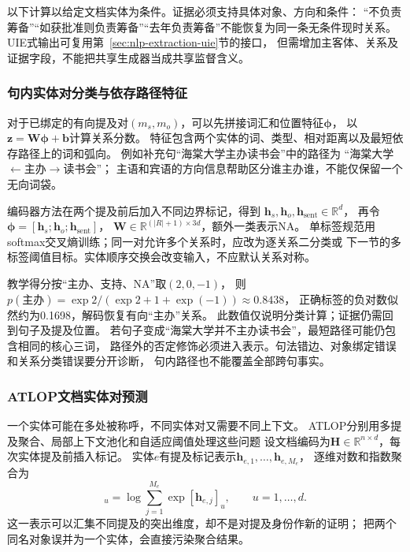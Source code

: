 以下计算以给定文档实体为条件。证据必须支持具体对象、方向和条件：
“不负责筹备”“如获批准则负责筹备”“去年负责筹备”不能恢复为同一条无条件现时关系。
UIE式输出可复用第~\ref{sec:nlp-extraction-uie}节的接口，
但需增加主客体、关系及证据字段，不能把共享生成器当成共享监督含义。

\subsubsection{句内实体对分类与依存路径特征}
\label{sec:nlp-extraction-sentence-re}

对于已绑定的有向提及对$(m_s,m_o)$，可以先拼接词汇和位置特征$\bm{\phi}$，
以$\bm{z}=\bm{W}\bm{\phi}+\bm{b}$计算关系分数。
特征包含两个实体的词、类型、相对距离以及最短依存路径上的词和弧向。
例如补充句“海棠大学主办读书会”中的路径为
“海棠大学$\leftarrow$主办$\rightarrow$读书会”；
主语和宾语的方向信息帮助区分谁主办谁，不能仅保留一个无向词袋。

编码器方法在两个提及前后加入不同边界标记，得到
$\bm{h}_s,\bm{h}_o,\bm{h}_{\mathrm{sent}}\in\mathbb{R}^{d}$，
再令$\bm{\phi}=[\bm{h}_s;\bm{h}_o;\bm{h}_{\mathrm{sent}}]$，
$\bm{W}\in\mathbb{R}^{(|R|+1)\times3d}$，额外一类表示NA。
单标签规范用softmax交叉熵训练；同一对允许多个关系时，应改为逐关系二分类或
下一节的多标签阈值目标。实体顺序交换会改变输入，不应默认关系对称。

教学得分按“主办、支持、NA”取$(2,0,-1)$，
则$p(\text{主办})=\exp2/(\exp2+1+\exp(-1))\approx0.8438$，
正确标签的负对数似然约为0.1698，解码恢复有向“主办”关系。
此数值仅说明分类计算；证据仍需回到句子及提及位置。
若句子变成“海棠大学并不主办读书会”，最短路径可能仍包含相同的核心三词，
路径外的否定修饰必须进入表示。句法错边、对象绑定错误和关系分类错误要分开诊断，
句内路径也不能覆盖全部跨句事实。

\subsubsection{ATLOP文档实体对预测}
\label{sec:nlp-extraction-atlop}

一个实体可能在多处被称呼，不同实体对又需要不同上下文。
ATLOP分别用多提及聚合、局部上下文池化和自适应阈值处理这些问题
设文档编码为$\bm{H}\in\mathbb{R}^{n\times d}$，每次实体提及前插入标记。
实体$e$有提及标记表示$\bm{h}_{e,1},\ldots,\bm{h}_{e,M_e}$，
逐维对数和指数聚合为
\begin{equation}
  [\bm{h}_e]_u=\log\sum_{j=1}^{M_e}\exp[\bm{h}_{e,j}]_u,
  \qquad u=1,\ldots,d.
  \label{eq:nlp-extraction-atlop-entity}
\end{equation}
这一表示可以汇集不同提及的突出维度，却不是对提及身份作新的证明；
把两个同名对象误并为一个实体，会直接污染聚合结果。

